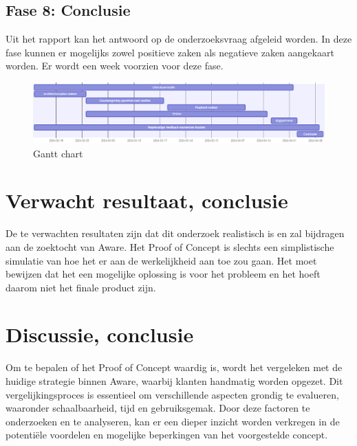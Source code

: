 \subsection{Fase 8: Conclusie}
\label{subsec:Fase 8: Conclusie}
Uit het rapport kan het antwoord op de onderzoeksvraag afgeleid worden. In deze fase kunnen er 
mogelijks zowel positieve zaken als negatieve zaken aangekaart worden. Er wordt een week voorzien voor deze fase.

\begin{figure}[!htb]
  \centering
  \includegraphics[width=\textwidth]{graphics/gantt.png}
  \caption{Gantt chart}
  \label{fig:gantt}
\end{figure}

\section{Verwacht resultaat, conclusie}%
\label{sec:verwachte_resultaten}

De te verwachten resultaten zijn dat dit onderzoek realistisch is en zal bijdragen aan de zoektocht van Aware. Het Proof of Concept is slechts een 
simplistische simulatie van hoe het er aan de werkelijkheid aan toe zou gaan. Het moet bewijzen dat het een mogelijke oplossing is 
voor het probleem en het hoeft daarom niet het finale product zijn.

\section{Discussie, conclusie}
\label{sec:Discussie-conclusie}
Om te bepalen of het Proof of Concept waardig is, wordt het vergeleken met de huidige strategie binnen Aware, waarbij klanten handmatig worden 
opgezet. Dit vergelijkingsproces is essentieel om verschillende aspecten grondig te evalueren, waaronder schaalbaarheid, tijd en 
gebruiksgemak. Door deze factoren te onderzoeken en te analyseren, kan er een dieper inzicht worden verkregen in de potentiële voordelen en mogelijke 
beperkingen van het voorgestelde concept.

